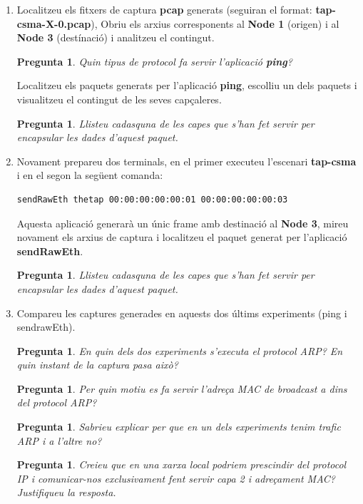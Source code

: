 \documentclass[12pt,a4paper]{article}
\newcounter{exercises}
\newtheorem{exer}[exercises]{Pregunta}
\begin{document}
\begin{enumerate}
\item Localitzeu els fitxers de captura \textbf{pcap} generats (seguiran el format: \textbf{tap-csma-X-0.pcap}),
Obriu els arxius corresponents al \textbf{Node 1} (origen) i al \textbf{Node 3}
(destínació) i analitzeu el contingut.

\begin{exer} Quin tipus de protocol fa servir l'aplicació \textbf{ping}? \end{exer}

Localitzeu els paquets generats per l'aplicació \textbf{ping}, escolliu un dels paquets i visualitzeu el contingut de les seves capçaleres.

\begin{exer} Llisteu cadasquna de les capes que s'han fet servir per encapsular les dades d'aquest paquet. \end{exer}

\item Novament prepareu dos terminals, en el primer executeu l'escenari  \textbf{tap-csma} i en el segon la següent comanda:
\begin{lstlisting}[language=bash]
sendRawEth thetap 00:00:00:00:00:01 00:00:00:00:00:03
\end{lstlisting}

Aquesta aplicació generarà un únic frame amb destinació al \textbf{Node 3}, mireu novament els arxius de captura i localitzeu
el paquet generat per l'aplicació \textbf{sendRawEth}.

\begin{exer} Llisteu cadasquna de les capes que s'han fet servir per encapsular les dades d'aquest paquet. \end{exer}

\item Compareu les captures generades en aquests dos últims experiments (ping i sendrawEth). 

\begin{exer} En quin dels dos experiments s'executa el protocol ARP? En quin instant de la captura pasa això? \end{exer}
\begin{exer} Per quin motiu es fa servir l'adreça MAC de broadcast a dins del protocol ARP? \end{exer}
\begin{exer} Sabrieu explicar per que en un dels experiments tenim trafic ARP i a l'altre no? \end{exer}
\begin{exer} Creieu que en una xarxa local podriem prescindir del protocol IP i comunicar-nos exclusivament fent servir capa 2 i adreçament MAC? Justifiqueu la resposta. \end{exer}

\end{enumerate}
\end{document}
